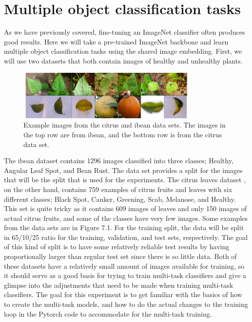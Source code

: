 \section{Multiple object classification tasks}
As we have previously covered, fine-tuning an ImageNet classifier often produces good results. 
Here we will take a pre-trained ImageNet backbone and learn multiple object classification tasks using the shared image embedding.
First, we will use two datasets that both contain images of healthy and unhealthy plants.

\begin{figure}[h!]
    \centering
    \includegraphics[width=0.8\textwidth]{imgs/citrus_beans_examples.png}
    \caption{Example images from the citrus and ibean data sets.
    The images in the top row are from ibean, and the bottom row is from the citrus data set.}
\end{figure}

The ibean dataset \citep{beansdata} contains 1296 images classified into three classes; Healthy, Angular Leaf Spot, and Bean Rust.
The data set provides a split for the images that will be the split that is used for the experiments.
The citrus leaves dataset \citep{citrusdata}, on the other hand, contains 759 examples of citrus fruits and leaves with six different classes; Black Spot, Canker, Greening, Scab, Melanose, and Healthy.
This set is quite tricky as it contains 609 images of leaves and only 150 images of actual citrus fruits, and some of the classes have very few images.
Some examples from the data sets are in Figure 7.1.
For the training split, the data will be split in 65/10/25 ratio for the training, validation, and test sets, respectively.
The goal of this kind of split is to have some relatively reliable test results by having proportionally larger than regular test set since there is so little data.
Both of these datasets have a relatively small amount of images available for training, so it should serve as a good basis for trying to train multi-task classifiers and give a glimpse into the adjustments that need to be made when training multi-task classifiers.
The goal for this experiment is to get familiar with the basics of how to create the multi-task models, and how to do the actual changes to the training loop in the Pytorch code to accommodate for the multi-task training.

